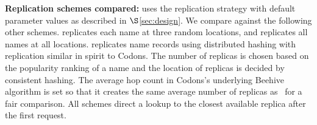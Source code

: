 {\textbf{Replication schemes compared:}}
\textbf{\auspice} uses the replication strategy with default parameter values as described in $\S$\ref{sec:design}. %
We compare against the following other schemes. \textbf{\staticthree} replicates each name at three random locations, and \textbf{\replicateall} replicates all names at all locations. \textbf{\codons} replicates name records using distributed hashing with replication similar in spirit to Codons\cite{codons-paper}. The number of replicas is chosen based on the popularity ranking of a name and  the location of replicas is decided by consistent hashing. The average hop count in Codons's underlying Beehive \cite{beehive} algorithm is set so that it creates the same average number of replicas as \auspice\ for a fair comparison. All schemes direct a lookup to the closest available replica after the first request.



